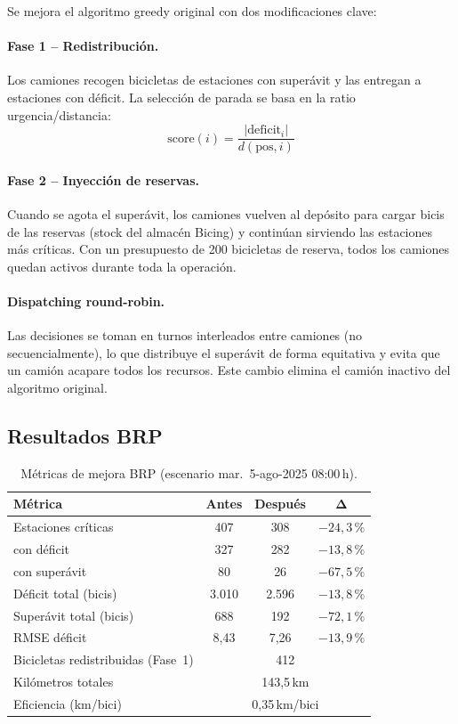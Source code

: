 \documentclass[12pt,a4paper]{article}
\begin{document}
Se mejora el algoritmo greedy original con dos modificaciones clave:

\paragraph{Fase 1 -- Redistribución.}
Los camiones recogen bicicletas de estaciones con superávit y las entregan a
estaciones con déficit. La selección de parada se basa en la ratio
urgencia/distancia:
\[
  \text{score}(i) = \frac{|\text{deficit}_i|}{d(\text{pos}, i)}
\]

\paragraph{Fase 2 -- Inyección de reservas.}
Cuando se agota el superávit, los camiones vuelven al depósito para cargar bicis
de las reservas (stock del almacén Bicing) y continúan sirviendo las estaciones
más críticas. Con un presupuesto de 200 bicicletas de reserva, todos los camiones
quedan activos durante toda la operación.

\paragraph{Dispatching round-robin.}
Las decisiones se toman en turnos interleados entre camiones (no secuencialmente),
lo que distribuye el superávit de forma equitativa y evita que un camión acapare
todos los recursos. Este cambio elimina el camión inactivo del algoritmo original.

\subsection{Resultados BRP}

\begin{table}[H]
\centering
\caption{Métricas de mejora BRP (escenario mar.\ 5-ago-2025 08:00\,h).}
\label{tab:brp_results}
\begin{tabular}{lccc}
\toprule
\textbf{Métrica} & \textbf{Antes} & \textbf{Después} & $\boldsymbol{\Delta}$ \\
\midrule
Estaciones críticas      & 407 & 308 & $-24{,}3\,\%$ \\
  \quad con déficit      & 327 & 282 & $-13{,}8\,\%$ \\
  \quad con superávit    &  80 &  26 & $-67{,}5\,\%$ \\
Déficit total (bicis)    & 3.010 & 2.596 & $-13{,}8\,\%$ \\
Superávit total (bicis)  &   688 &   192 & $-72{,}1\,\%$ \\
RMSE déficit             &  8,43 &  7,26 & $-13{,}9\,\%$ \\
\midrule
Bicicletas redistribuidas (Fase~1) & \multicolumn{3}{c}{412} \\
Kilómetros totales                  & \multicolumn{3}{c}{143,5\,km} \\
Eficiencia (km/bici)                & \multicolumn{3}{c}{0,35\,km/bici} \\
\bottomrule
\end{tabular}
\end{table}
\end{document}
